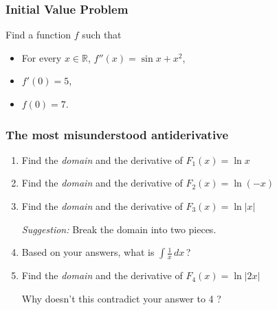 \documentclass[14pt]{beamer}
\date{}
\title{}
\author{}
\newcommand {\DS} [1] {${\displaystyle #1}$}
\newcommand {\R}{\mathbb{R}}
\newcommand{\p}{\pause}
\newcommand{\azul}[1]{{\color{blue} #1}}
\newcommand{\setsize}[1]{\fontsize{#1}{#1}\selectfont} %
\newcommand{\smallerfont}{\setsize{13}} %
\newcommand{\vv}{\vspace{.1cm}}
\begin{document}

\begin{frame}[t]
\frametitle{Initial Value Problem}

Find a function $f$ such that
	\begin{itemize}
		\item  For every \DS{x \in \R},  \DS{f''(x) = \sin x + x^2},
		\item  \DS{f'(0) = 5},
		\item  \DS{f(0) = 7}.
	\end{itemize}

\end{frame}
\begin{frame}[t]
\smallerfont
\frametitle{The most misunderstood antiderivative}
\begin{enumerate}
	\item Find the \emph{domain} and the derivative of \; \DS{F_1(x) = \ln x}
		\vv
	\item Find the \emph{domain} and the derivative of \; \DS{F_2(x) = \ln (-x)}
		\vv
	\item Find the \emph{domain} and the derivative of \; \DS{F_3(x) = \ln |x|}
		\vv
		
		\emph{Suggestion:}  Break the domain into two pieces.
		\vv
\p
	\item \label{qu:ln} Based on your answers, what is \DS{\int \frac{1}{x} \,dx \,}?
		\vv
\p 
	\item Find the \emph{domain} and the derivative of \; \DS{F_4(x) = \ln |2x|}
		\vv
	
		Why doesn't this contradict your answer to \azul{4} ?
\end{enumerate}

\end{frame}
\end{document}
